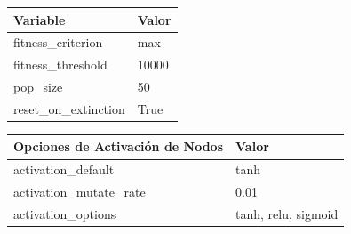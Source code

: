 \documentclass[lettersize, journal]{IEEEtran}
\begin{document}
\begin{table}[H]
    \centering
    \label{tab:NEAT}
    \begin{tabular}{ll}
    \toprule
    \textbf{Variable} & \textbf{Valor} \\
    \midrule
    fitness\_criterion     & max \\
    fitness\_threshold     & 10000 \\
    pop\_size              & 50 \\
    reset\_on\_extinction  & True  \\
    \bottomrule
    \end{tabular}
    \vspace{0.5cm}
    

    \label{tab:DefaultGenome_1}
    \begin{tabular}{ll}
    \toprule
    \textbf{Opciones de Activación de Nodos} & \textbf{Valor} \\
    \midrule
    activation\_default       & tanh \\
    activation\_mutate\_rate  & 0.01 \\
    activation\_options       & tanh, relu, sigmoid \\
    \bottomrule
    \end{tabular}

\end{table}

    
\end{document}
